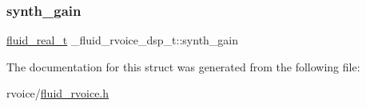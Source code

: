 \subsubsection{\texorpdfstring{synth\+\_\+gain}{synth\_gain}}
{\footnotesize\ttfamily \hyperlink{fluidsynth__priv_8h_a9e96f0917747b69cabb7c671bc693dbb}{fluid\+\_\+real\+\_\+t} \+\_\+fluid\+\_\+rvoice\+\_\+dsp\+\_\+t\+::synth\+\_\+gain}



The documentation for this struct was generated from the following file\+:\begin{DoxyCompactItemize}
\item 
rvoice/\hyperlink{fluid__rvoice_8h}{fluid\+\_\+rvoice.\+h}\end{DoxyCompactItemize}
